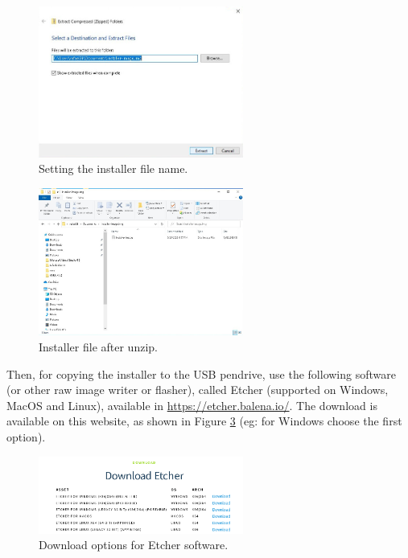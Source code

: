 \documentclass[11pt,a4paper]{article}
\begin{document}
\begin{figure}[H]
  \centering
  \includegraphics[width=0.6\textwidth]{pictures/extract-2-ed.jpg}
  \caption{Setting the installer file name.}
  \label{fig:extract2}
\end{figure}

\begin{figure}[H]
  \centering
  \includegraphics[width=0.6\textwidth]{pictures/extract-3-ed.jpg}
  \caption{Installer file after unzip.}
  \label{fig:extract3}
\end{figure}

Then, for copying the installer to the USB pendrive, use the following software (or other raw image writer or flasher), called
Etcher (supported on Windows, MacOS and Linux), available in \url{https://etcher.balena.io/}. The download is available on this website,
as shown in Figure \ref{fig:balena1} (eg: for Windows choose the first option).

\begin{figure}[H]
  \centering
  \includegraphics[width=0.6\textwidth]{pictures/balena-1.png}
  \caption{Download options for Etcher software.}
  \label{fig:balena1}
\end{figure}
\end{document}
